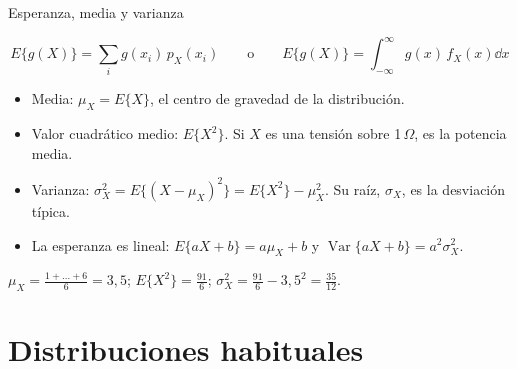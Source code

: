 \documentclass[aspectratio=169,11pt]{beamer}
\begin{document}
\begin{frame}{Esperanza, media y varianza}
  \small
  \begin{definicion}[Esperanza]
    \[
      E\{g(X)\}=\sum_ig(x_i)\,p_X(x_i)\qquad\text{o}\qquad E\{g(X)\}=\int_{-\infty}^{\infty}g(x)\,f_X(x)\dd x
    \]
  \end{definicion}
  \begin{itemize}
    \item \alert{Media}: $\mu_X=E\{X\}$, el centro de gravedad de la distribución.
    \item \alert{Valor cuadrático medio}: $E\{X^2\}$. Si $X$ es una tensión sobre 1\,$\Omega$, es la potencia media.
    \item \alert{Varianza}: $\sigma_X^2=E\{(X-\mu_X)^2\}=E\{X^2\}-\mu_X^2$. Su raíz, $\sigma_X$, es la \alert{desviación típica}.
    \item La esperanza es lineal: $E\{aX+b\}=a\mu_X+b$ y $\operatorname{Var}\{aX+b\}=a^2\sigma_X^2$.
  \end{itemize}
  \begin{ejemplo}[Dado]
    $\mu_X=\frac{1+\dots+6}6=3{,}5$; $E\{X^2\}=\frac{91}6$; $\sigma_X^2=\frac{91}6-3{,}5^2=\frac{35}{12}$.
  \end{ejemplo}
\end{frame}

\section{Distribuciones habituales}
\end{document}
